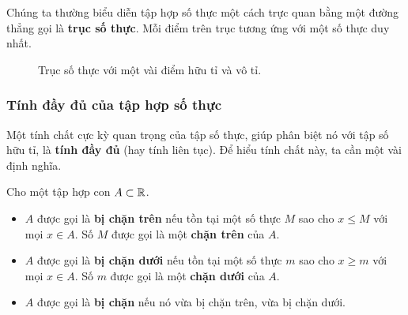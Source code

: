 Chúng ta thường biểu diễn tập hợp số thực một cách trực quan bằng một đường thẳng gọi là \textbf{trục số thực}. Mỗi điểm trên trục tương ứng với một số thực duy nhất.

\begin{figure}[htbp]
    \centering
    \caption{Trục số thực với một vài điểm hữu tỉ và vô tỉ.}
    \label{fig:real_number_line}
\end{figure}

\subsubsection{Tính đầy đủ của tập hợp số thực}

Một tính chất cực kỳ quan trọng của tập số thực, giúp phân biệt nó với tập số hữu tỉ, là \textbf{tính đầy đủ} (hay tính liên tục). Để hiểu tính chất này, ta cần một vài định nghĩa.

\begin{definition}
    Cho một tập hợp con $A \subset \mathbb{R}$.
    \begin{itemize}
        \item $A$ được gọi là \textbf{bị chặn trên} nếu tồn tại một số thực $M$ sao cho $x \le M$ với mọi $x \in A$. Số $M$ được gọi là một \textbf{chặn trên} của $A$.
        \item $A$ được gọi là \textbf{bị chặn dưới} nếu tồn tại một số thực $m$ sao cho $x \ge m$ với mọi $x \in A$. Số $m$ được gọi là một \textbf{chặn dưới} của $A$.
        \item $A$ được gọi là \textbf{bị chặn} nếu nó vừa bị chặn trên, vừa bị chặn dưới.
    \end{itemize}
\end{definition}

